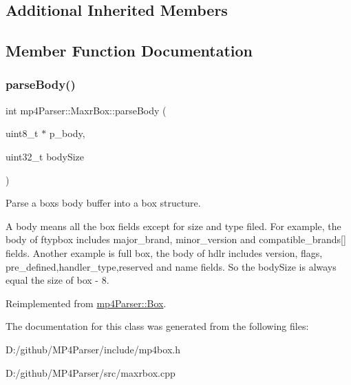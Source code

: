 \subsection*{Additional Inherited Members}


\subsection{Member Function Documentation}
\mbox{\label{classmp4_parser_1_1_maxr_box_a3a949e14defbdc89190b1dfc0509f3ad}} 
\subsubsection{\texorpdfstring{parseBody()}{parseBody()}}
{\footnotesize\ttfamily int mp4\+Parser\+::\+Maxr\+Box\+::parse\+Body (\begin{DoxyParamCaption}\item[{uint8\+\_\+t $\ast$}]{p\+\_\+body,  }\item[{uint32\+\_\+t}]{body\+Size }\end{DoxyParamCaption})\hspace{0.3cm}{\ttfamily [virtual]}}



Parse a box\textquotesingle{}s body buffer into a box structure. 

A body means all the box fields except for size and type filed. For example, the body of ftypbox includes major\+\_\+brand, minor\+\_\+version and compatible\+\_\+brands\mbox{[}\mbox{]} fields. Another example is full box, the body of hdlr includes version, flags, pre\+\_\+defined,handler\+\_\+type,reserved and name fields. So the body\+Size is always equal the size of box -\/ 8. 

Reimplemented from \mbox{\hyperlink{classmp4_parser_1_1_box_a3dd0c084ac65bc77b69ac5ecaf796cb2}{mp4\+Parser\+::\+Box}}.



The documentation for this class was generated from the following files\+:\begin{DoxyCompactItemize}
\item 
D\+:/github/\+M\+P4\+Parser/include/mp4box.\+h\item 
D\+:/github/\+M\+P4\+Parser/src/maxrbox.\+cpp\end{DoxyCompactItemize}
